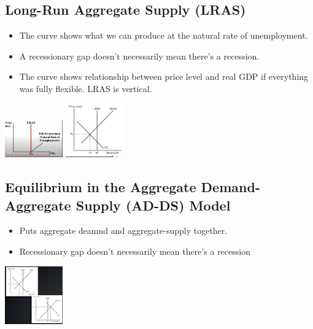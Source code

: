 \documentclass[8pt]{beamer}
\begin{document}
  \begin{frame}
	\section{Long-Run Aggregate Supply (LRAS)}
	\begin{itemize}
		\item The curve shows what we can produce at the natural rate of unemployment.
		\item A recessionary gap doesn't necessarily mean there's a recession.
		\item The curve shows relationship between price level and real GDP if
		everything was fully flexible. LRAS is vertical. 
	\end{itemize}
	\includegraphics[width=2.5cm]{2021-10-12-12-18-10.png}
	\includegraphics[width=2.5cm]{2021-10-12-12-58-09.png}
  \end{frame}
  \begin{frame}
	\section{Equilibrium in the Aggregate Demand-Aggregate Supply (AD-DS) Model}
	\begin{itemize}
		\item Puts aggregate deamnd and aggregate-supply together.
		\item Recessionary gap doesn't necessarily mean there's a recession
	\end{itemize}
	\includegraphics[width=2.5cm]{2021-10-12-12-45-18.png}
  \end{frame}
\end{document}
